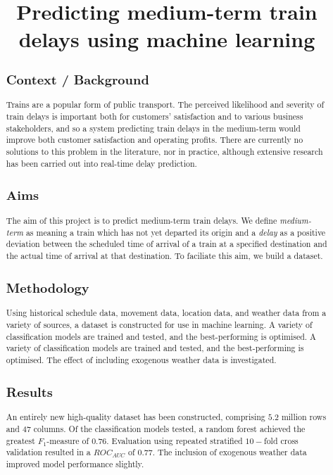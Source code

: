 \documentclass[12pt,a4paper]{article}
\title{Predicting medium-term train delays using machine learning}
\date{}
\begin{document}
\maketitle

\begin{abstract}

\subsection{Context / Background}

Trains are a popular form of public transport. The perceived likelihood and severity of train delays is important both for customers' satisfaction and to various business stakeholders, and so a system predicting train delays in the medium-term would improve both customer satisfaction and operating profits. There are currently no solutions to this problem in the literature, nor in practice, although extensive research has been carried out into real-time delay prediction.

\subsection{Aims}

The aim of this project is to predict medium-term train delays. We define \textit{medium-term} as meaning a train which has not yet departed its origin and a \textit{delay} as a positive deviation between the scheduled time of arrival of a train at a specified destination and the actual time of arrival at that destination. To faciliate this aim, we build a dataset.

\subsection{Methodology}

Using historical schedule data, movement data, location data, and weather data from a variety of sources, a dataset is constructed for use in machine learning. A variety of classification models are trained and tested, and the best-performing is optimised.  A variety of classification models are trained and tested, and the best-performing is optimised. The effect of including exogenous weather data is investigated.

\subsection{Results}

An entirely new high-quality dataset has been constructed, comprising $5.2$ million rows and $47$ columns. Of the classification models tested, a random forest achieved the greatest $F_1$-measure of $0.76$. Evaluation using repeated stratified $10-$fold cross validation resulted in a $ROC_{AUC}$ of $0.77$. The inclusion of exogenous weather data improved model performance slightly. 


\end{abstract}
\end{document}
